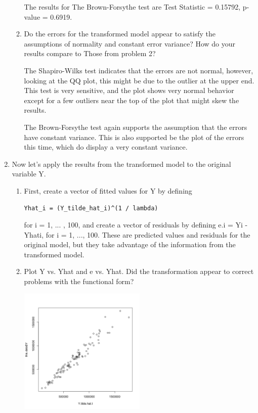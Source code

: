 \documentclass[11pt]{article}
\begin{document}
\begin{enumerate}
\begin{enumerate}
The results for The Brown-Forsythe test are 
Test Statistic = 0.15792, p-value = 0.6919.

\item 
Do the errors for the transformed model appear to satisfy the assumptions 
of normality and constant error variance? How do your results compare to 
Those from problem 2? 

The Shapiro-Wilks test indicates that the errors are not normal, however, 
looking at the QQ plot, this might be due to the outlier at the upper end. 
This test is very sensitive, and the plot shows very normal behavior except for 
a few outliers near the top of the plot that might skew the results. 

The Brown-Forsythe test again supports the assumption that the errors 
have constant variance. This is also supported be the plot of the errors this time, 
which do display a very constant variance. 

\end{enumerate}

\item 
Now let's apply the results from the transformed model to the original variable Y. 

\begin{enumerate}
\item 
First, create a vector of fitted values for Y by defining 
\begin{Verbatim}
Yhat_i = (Y_tilde_hat_i)^(1 / lambda)
\end{Verbatim}
for i = 1, ... , 100, and create a 
vector of residuals by defining e.i = Yi - Yhati, for i = 1, ..., 100. These 
are predicted values and residuals for the original model, but they take 
advantage of the information from the transformed model. 

\item 
Plot Y vs. Yhat and e vs. Yhat. Did the transformation appear to correct 
problems with the functional form? 

\begin{center}
\includegraphics[width=0.5\textwidth]{Y_vs_Ytildehat_t}
\end{center}


\end{enumerate}
\end{enumerate}
\end{document}
